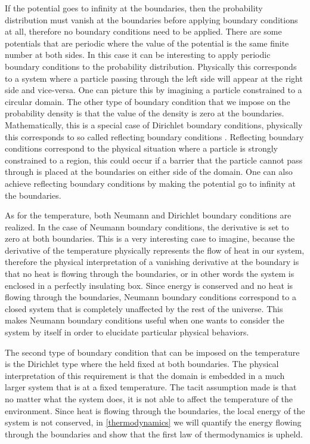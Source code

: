 If the potential goes to infinity at the boundaries, then the probability distribution must vanish at the boundaries before applying boundary conditions at all, therefore no boundary conditions need to be applied. There are some potentials that are periodic where the value of the potential is the same finite number at both sides. In this case it can be interesting to apply periodic boundary conditions to the probability distribution. Physically this corresponds to a system where a particle passing through the left side will appear at the right side and vice-versa. One can picture this by imagining a particle constrained to a circular domain. The other type of boundary condition that we impose on the probability density is that the value of the density is zero at the boundaries. Mathematically, this is a special case of Dirichlet boundary conditions, physically this corresponds to so called reflecting boundary conditions \cite{Gardiner2009}. Reflecting boundary conditions correspond to the physical situation where a particle is strongly constrained to a region, this could occur if a barrier that the particle cannot pass through is placed at the boundaries on either side of the domain. One can also achieve reflecting boundary conditions by making the potential go to infinity at the boundaries.

As for the temperature, both Neumann and Dirichlet boundary conditions are realized. In the case of Neumann boundary conditions, the derivative is set to zero at both boundaries. This is a very interesting case to imagine, because the derivative of the temperature physically represents the flow of heat in our system, therefore the physical interpretation of a vanishing derivative at the boundary is that no heat is flowing through the boundaries, or in other words the system is enclosed in a perfectly insulating box. Since energy is conserved and no heat is flowing through the boundaries, Neumann boundary conditions correspond to a closed system that is completely unaffected by the rest of the universe. This makes Neumann boundary conditions useful when one wants to consider the system by itself in order to elucidate particular physical behaviors.

The second type of boundary condition that can be imposed on the temperature is the Dirichlet type where the held fixed at both boundaries. The physical interpretation of this requirement is that the domain is embedded in a much larger system that is at a fixed temperature. The tacit assumption made is that no matter what the system does, it is not able to affect the temperature of the environment. Since heat is flowing through the boundaries, the local energy of the system is not conserved, in \autoref{thermodynamics} we will quantify the energy flowing through the boundaries and show that the first law of thermodynamics is upheld.
